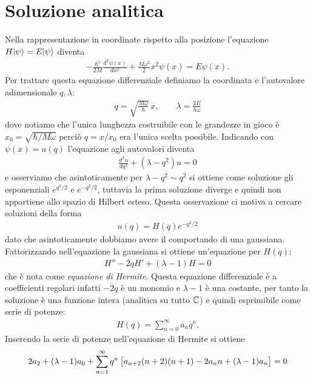 \section{Soluzione analitica}

Nella rappresentazione in coordinate rispetto alla posizione l'equazione $ H\vert \psi \rangle = E \vert \psi \rangle $ diventa 
\begin{align*}
  -\frac{\hbar^2}{2M} \frac{d^2 \psi(x)}{dx^2} + \frac{M \omega^2}2 x^2 \psi(x) = E \psi(x).
\end{align*}
Per trattare questa equazione differenziale definiamo la coordinata e l'autovalore adimensionale $ q, \lambda $:
\begin{align*}
  q = \sqrt{\frac{M\omega}{\hbar}} \,x, \qquad \lambda = \frac{2E}{\hbar \omega}
\end{align*}
dove notiamo che l'unica lunghezza costruibile con le grandezze in gioco è $ x_0 = \sqrt{\hbar/M\omega} $ perciò $ q = x/x_0 $ era l'unica scelta 
possibile. Indicando con $ \psi(x) = u (q) $ l'equazione agli autovalori diventa 
\begin{align*}
  \frac{d^2 u}{dq^2} + \left( \lambda - q^2 \right) u = 0
\end{align*}
e osserviamo che asintoticamente per $ \lambda - q^2 \sim q^2 $ si ottiene come soluzione gli esponenziali $ e^{q^2 /2} $ e $ e^{-q^2 /2} $, tuttavia la 
prima soluzione diverge e quindi non appartiene allo spazio di Hilbert esteso. Questa osservazione ci motiva a cercare soluzioni della forma 
\begin{align*}
  u(q) = H(q) e^{-{q^2}/2}
\end{align*}
dato che asintoticamente dobbiamo avere il comportando di una gaussiana. Fattorizzando nell'equazione la gaussiana si ottiene un'equazione per $ H(q) $:
\begin{align*}
  H'' - 2 q H' + \left( \lambda - 1 \right) H = 0
\end{align*}
che è nota come \textit{equazione di Hermite}. Questa equazione differenziale è a coefficienti regolari infatti $ -2q $ è un monomio e $ \lambda - 1 $ 
è una costante, per tanto la soluzione è una funzione intera (analitica su tutto $ \mathbb{C} $) e quindi esprimibile come serie di potenze:
\begin{align*}
  H(q) = \sum_{n = 0}^\infty a_n q^n.
\end{align*}
Inserendo la serie di potenze nell'equazione di Hermite si ottiene 
\begin{align*}
  2 a_2 + (\lambda - 1)a_0 + \sum_{n = 1}^\infty q^n \left[ \phb a_{n+2} (n+2)(n+1) - 2 a_n n + (\lambda -1)a_n  \right]  = 0
\end{align*}
